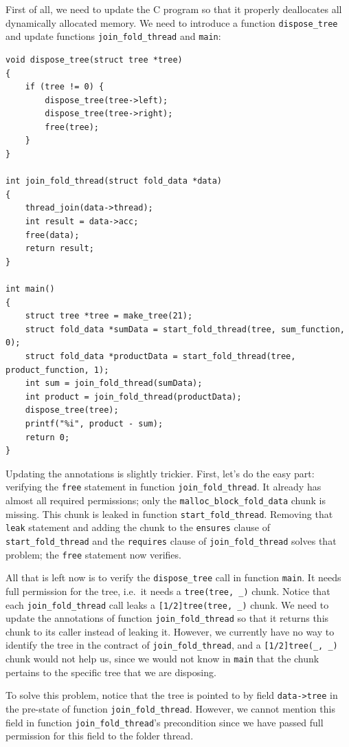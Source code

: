 \documentclass{article}
\begin{document}
First of all, we need to update the C program so that it
properly deallocates all dynamically allocated memory. We need to introduce a function \lstinline|dispose_tree| and update
functions \lstinline|join_fold_thread| and \lstinline|main|:
\begin{lstlisting}
void dispose_tree(struct tree *tree)
{
    if (tree != 0) {
        dispose_tree(tree->left);
        dispose_tree(tree->right);
        free(tree);
    }
}

int join_fold_thread(struct fold_data *data)
{
    thread_join(data->thread);
    int result = data->acc;
    free(data);
    return result;
}

int main()
{
    struct tree *tree = make_tree(21);
    struct fold_data *sumData = start_fold_thread(tree, sum_function, 0);
    struct fold_data *productData = start_fold_thread(tree, product_function, 1);
    int sum = join_fold_thread(sumData);
    int product = join_fold_thread(productData);
    dispose_tree(tree);
    printf("%i", product - sum);
    return 0;
}
\end{lstlisting}

Updating the annotations is slightly trickier. First, let's do
the easy part: verifying the \lstinline|free| statement in
function \lstinline|join_fold_thread|. It already has almost
all required permissions; only the
\lstinline|malloc_block_fold_data| chunk is missing. This chunk
is leaked in function \lstinline|start_fold_thread|. Removing
that \lstinline|leak| statement and adding the chunk to the
\lstinline|ensures| clause of \lstinline|start_fold_thread| and
the \lstinline|requires| clause of \lstinline|join_fold_thread|
solves that problem; the \lstinline|free| statement now
verifies.

All that is left now is to verify the \lstinline|dispose_tree|
call in function \lstinline|main|. It needs full permission for
the tree, i.e.~it needs a \lstinline|tree(tree, _)| chunk.
Notice that each \lstinline|join_fold_thread| call leaks a
\lstinline|[1/2]tree(tree, _)| chunk. We need to update the
annotations of function \lstinline|join_fold_thread| so that it
returns this chunk to its caller instead of leaking it.
However, we currently have no way to identify the tree in the
contract of \lstinline|join_fold_thread|, and a
\lstinline|[1/2]tree(_, _)| chunk would not help us, since we
would not know in \lstinline|main| that the chunk pertains to
the specific tree that we are disposing.

To solve this problem, notice that the tree is pointed to by
field \lstinline|data->tree| in the pre-state of function
\lstinline|join_fold_thread|. However, we cannot mention this
field in function \lstinline|join_fold_thread|'s precondition
since we have passed full permission for this field to the
folder thread.
\end{document}
